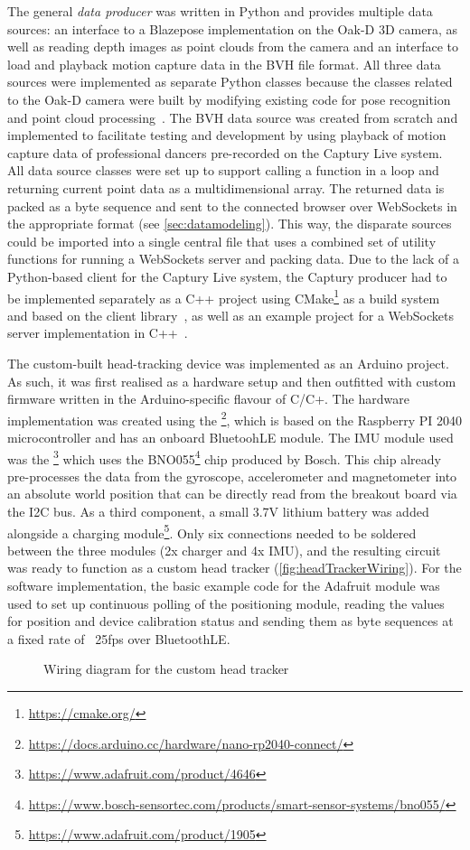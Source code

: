 The general \emph{data producer} was written in Python and provides multiple data sources: an interface to a Blazepose implementation on the Oak-D \ac{3D} camera, as well as reading depth images as point clouds from the camera and an interface to load and playback motion capture data in the \ac{BVH} file format.
All three data sources were implemented as separate Python classes because the classes related to the Oak-D camera were built by modifying existing code for pose recognition~\parencite{githubDepthAiBlazePose} and point cloud processing~\parencite{githubDepthAiPointcloud}.
The \ac{BVH} data source was created from scratch and implemented to facilitate testing and development by using playback of motion capture data of professional dancers pre-recorded on the Captury Live system.
All data source classes were set up to support calling a function in a loop and returning current point data as a multidimensional array.
The returned data is packed as a byte sequence and sent to the connected browser over WebSockets in the appropriate format (see \autoref{sec:datamodeling}).
This way, the disparate sources could be imported into a single central file that uses a combined set of utility functions for running a WebSockets server and packing data.
Due to the lack of a Python-based client for the Captury Live system, the Captury producer had to be implemented separately as a C++ project using CMake\footnote{\url{https://cmake.org/}} as a build system and based on the  client library~\parencite{githubRemoteCaptury}, as well as an example project for a WebSockets server implementation in C++~\parencite{githubCppWebSocketsDemo}.

The custom-built head-tracking device was implemented as an Arduino project.
As such, it was first realised as a hardware setup and then outfitted with custom firmware written in the Arduino-specific flavour of C/C+.
The hardware implementation was created using the \footnote{\url{https://docs.arduino.cc/hardware/nano-rp2040-connect/}}, which is based on the Raspberry PI 2040 microcontroller and has an onboard BluetoohLE module.
The \ac{IMU} module used was the \footnote{\url{https://www.adafruit.com/product/4646}} which uses the BNO055\footnote{\url{https://www.bosch-sensortec.com/products/smart-sensor-systems/bno055/}} chip produced by Bosch.
This chip already pre-processes the data from the gyroscope, accelerometer and magnetometer into an absolute world position that can be directly read from the breakout board via the \ac{I2C} bus.
As a third component, a small 3.7V lithium battery was added alongside a charging module\footnote{\url{https://www.adafruit.com/product/1905}}.
Only six connections needed to be soldered between the three modules (2x charger and 4x \ac{IMU}), and the resulting circuit was ready to function as a custom head tracker (\autoref{fig:headTrackerWiring}).
For the software implementation, the basic example code for the Adafruit module was used to set up continuous polling of the positioning module, reading the values for position and device calibration status and sending them as byte sequences at a fixed rate of ~25fps over BluetoothLE\@.

\begin{figure}[!ht]
\centering

\caption[Head tracker wiring diagram]{Wiring diagram for the custom head tracker\protect}
\label{fig:headTrackerWiring}
\end{figure}
